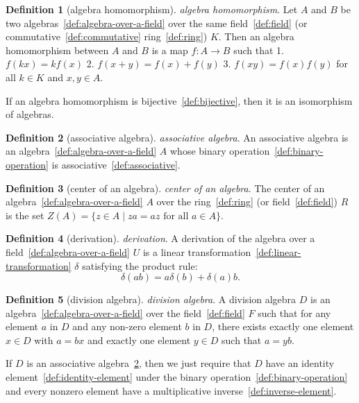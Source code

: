 \documentclass[12pt,a4paper]{article}
\theoremstyle{definition}
\newtheorem{definition}{Definition}
\begin{document}
\begin{definition}[algebra homomorphism]\label{def:algebra-homomorphism}
\emph{algebra homomorphism}. Let $A$ and $B$ be two algebras~\ref{def:algebra-over-a-field} over the same field~\ref{def:field} (or commutative~\ref{def:commutative} ring~\ref{def:ring}) $K$. Then an algebra homomorphism between $A$ and $B$ is a map $f:A\to B$ such that 
1. $f(kx) = kf(x)$
2. $f(x+y) = f(x) + f(y)$
3. $f(xy) = f(x)f(y)$
for all $k\in K$ and $x,y\in A$.

If an algebra homomorphism is bijective~\ref{def:bijective}, then it is an isomorphism of algebras.
\end{definition}

\begin{definition}[associative algebra]\label{def:associative-algebra}
\emph{associative algebra}. An associative algebra is an algebra~\ref{def:algebra-over-a-field} $A$ whose binary operation~\ref{def:binary-operation} is associative~\ref{def:associative}.
\end{definition}

\begin{definition}[center of an algebra]\label{def:center-of-an-algebra}
\emph{center of an algebra}. The center of an algebra~\ref{def:algebra-over-a-field} $A$ over the ring~\ref{def:ring} (or field~\ref{def:field}) $R$ is the set $Z(A) = \{z\in A \mid za=az \text{ for all } a\in A\}$.
\end{definition}

\begin{definition}[derivation]\label{def:derivation}
\emph{derivation}. A derivation of the algebra over a field~\ref{def:algebra-over-a-field} $U$ is a linear transformation~\ref{def:linear-transformation} $\delta$ satisfying the product rule: $$\delta(ab) = a\delta(b) + \delta(a) b.$$
\end{definition}

\begin{definition}[division algebra]\label{def:division-algebra}
\emph{division algebra}. A division algebra $D$  is an algebra~\ref{def:algebra-over-a-field} over the field~\ref{def:field} $F$ such that for any element $a$ in $D$ and any non-zero element $b$ in $D$, there exists exactly one element $x\in D$ with $a=bx$ and exactly one element $y \in D$ such that $a=yb$.

If $D$ is an associative algebra~\ref{def:associative-algebra}, then we just require that $D$ have an identity element~\ref{def:identity-element} under the binary operation~\ref{def:binary-operation} and every nonzero element have a multiplicative inverse~\ref{def:inverse-element}.
\end{definition}
\end{document}
